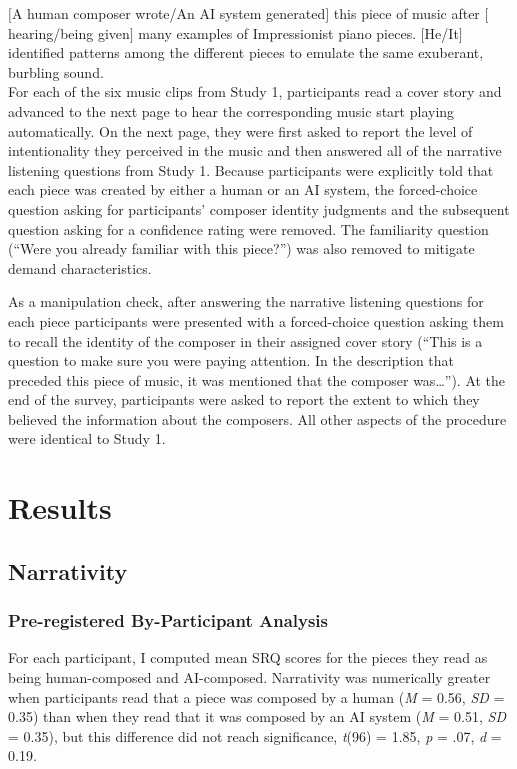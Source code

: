 \documentclass[12pt,twoside]{reedthesis}
\begin{document}
$[$A human composer wrote/An AI system generated$]$ this piece of music after $[$hearing/being given$]$ many examples of Impressionist piano pieces. $[$He/It$]$ identified patterns among the different pieces to emulate the same exuberant, burbling sound.
\\

For each of the six music clips from Study 1, participants read a cover story and advanced to the next page to hear the corresponding music start playing automatically. On the next page, they were first asked to report the level of intentionality they perceived in the music and then answered all of the narrative listening questions from Study 1. Because participants were explicitly told that each piece was created by either a human or an AI system, the forced-choice question asking for participants’ composer identity judgments and the subsequent question asking for a confidence rating were removed. The familiarity question (“Were you already familiar with this piece?”) was also removed to mitigate demand characteristics. 

As a manipulation check, after answering the narrative listening questions for each piece participants were presented with a forced-choice question asking them to recall the identity of the composer in their assigned cover story (“This is a question to make sure you were paying attention. In the description that preceded this piece of music, it was mentioned that the composer was…”). At the end of the survey, participants were asked to report the extent to which they believed the information about the composers. All other aspects of the procedure were identical to Study 1.

\section{Results}

\subsection{Narrativity}
\subsubsection*{Pre-registered By-Participant Analysis}
For each participant, I computed mean SRQ scores for the pieces they read as being human-composed and AI-composed. Narrativity was numerically greater when participants read that a piece was composed by a human (\emph{M} = 0.56, \emph{SD} = 0.35) than when they read that it was composed by an AI system (\emph{M} = 0.51, \emph{SD} = 0.35), but this difference did not reach significance, \emph{t}(96) = 1.85, \emph{p} = .07, \emph{d} = 0.19.
\end{document}
